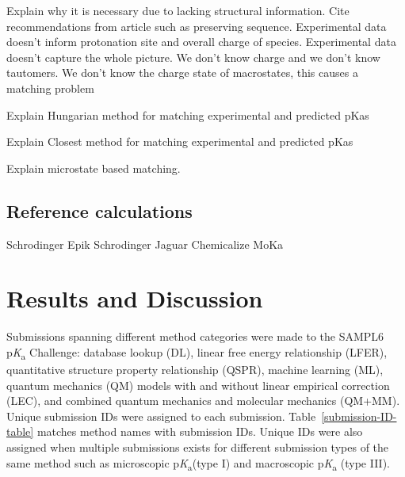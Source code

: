 \documentclass[9pt,lineno,final]{elife}
\newcommand{\pKa}{p\textit{K}\textsubscript{a}}
\begin{document}
Explain why it is necessary due to lacking structural information. Cite recommendations from article such as preserving sequence.
Experimental data doesn't inform protonation site and overall charge of species.
 Experimental data doesn't capture the whole picture. We don't know charge and we don't know tautomers.
 We don't know the charge state of macrostates, this causes a matching problem


Explain Hungarian method for matching experimental and predicted pKas

Explain Closest method for matching experimental and predicted pKas

Explain microstate based matching.


\subsection{Reference calculations}

Schrodinger Epik
Schrodinger Jaguar
Chemicalize
MoKa


\section{Results and Discussion}

 Submissions spanning different method categories were made to the SAMPL6 \pKa{} Challenge: database lookup (DL), linear free energy relationship (LFER), quantitative structure property relationship (QSPR), machine learning (ML), quantum mechanics (QM) models with and without linear empirical correction (LEC), and combined quantum mechanics and molecular mechanics (QM+MM). Unique submission IDs were assigned to each submission. Table~\ref{submission-ID-table} matches method names with submission IDs. Unique IDs were also assigned when multiple submissions exists for different submission types of the same method such as microscopic \pKa{}(type I) and macroscopic \pKa{} (type III). 
\end{document}

